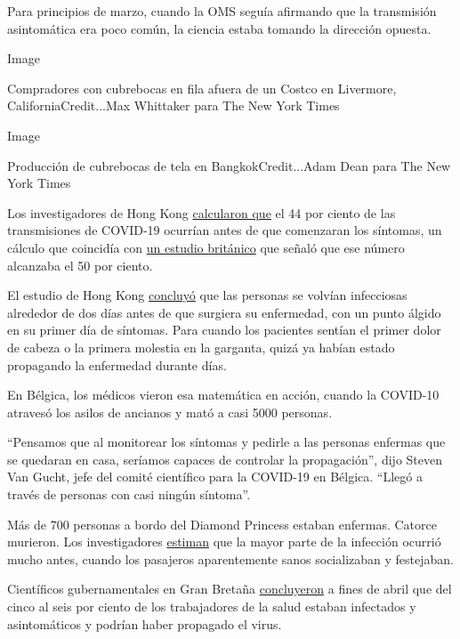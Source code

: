 Para principios de marzo, cuando la OMS seguía afirmando que la
transmisión asintomática era poco común, la ciencia estaba tomando la
dirección opuesta.

Image

Compradores con cubrebocas en fila afuera de un Costco en Livermore,
CaliforniaCredit...Max Whittaker para The New York Times

Image

Producción de cubrebocas de tela en BangkokCredit...Adam Dean para The
New York Times

Los investigadores de Hong Kong
\href{https://www.nature.com/articles/s41591-020-0869-5.pdf}{calcularon
que} el 44 por ciento de las transmisiones de COVID-19 ocurrían antes de
que comenzaran los síntomas, un cálculo que coincidía con
\href{https://science.sciencemag.org/content/368/6491/eabb6936}{un
estudio británico} que señaló que ese número alcanzaba el 50 por ciento.

El estudio de Hong Kong
\href{https://www.nature.com/articles/s41591-020-0869-5.pdf}{concluyó}
que las personas se volvían infecciosas alrededor de dos días antes de
que surgiera su enfermedad, con un punto álgido en su primer día de
síntomas. Para cuando los pacientes sentían el primer dolor de cabeza o
la primera molestia en la garganta, quizá ya habían estado propagando la
enfermedad durante días.

En Bélgica, los médicos vieron esa matemática en acción, cuando la
COVID-10 atravesó los asilos de ancianos y mató a casi 5000 personas.

``Pensamos que al monitorear los síntomas y pedirle a las personas
enfermas que se quedaran en casa, seríamos capaces de controlar la
propagación'', dijo Steven Van Gucht, jefe del comité científico para la
COVID-19 en Bélgica. ``Llegó a través de personas con casi ningún
síntoma''.

Más de 700 personas a bordo del Diamond Princess estaban enfermas.
Catorce murieron. Los investigadores
\href{https://www.eurosurveillance.org/content/10.2807/1560-7917.ES.2020.25.10.2000180\#html_fulltext}{estiman}
que la mayor parte de la infección ocurrió mucho antes, cuando los
pasajeros aparentemente sanos socializaban y festejaban.

Científicos gubernamentales en Gran Bretaña
\href{https://assets.publishing.service.gov.uk/government/uploads/system/uploads/attachment_data/file/888804/S0399_Thirtieth_SAGE_meeting_on_Covid-19_.pdf}{concluyeron}
a fines de abril que del cinco al seis por ciento de los trabajadores de
la salud estaban infectados y asintomáticos y podrían haber propagado el
virus.

